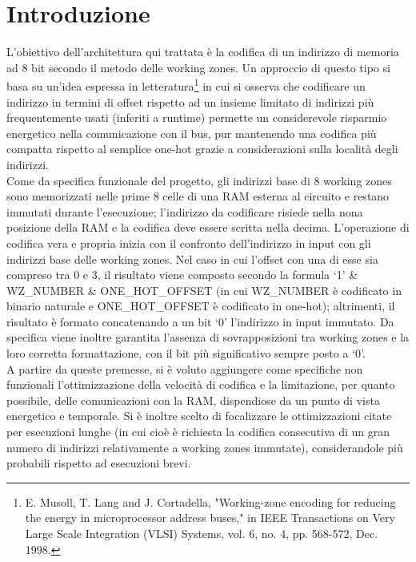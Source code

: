 \documentclass[10pt,english, openany]{book}
\begin{document}
\chapter{Introduzione}\label{chapt:sum}


L’obiettivo dell’architettura qui trattata è la codifica di un indirizzo di memoria ad 8 bit secondo il metodo delle working zones. Un approccio di questo tipo si basa su un’idea espressa in letteratura\footnote{\label{paper_citation}E. Musoll, T. Lang and J. Cortadella, "Working-zone encoding for reducing the energy in microprocessor address buses," in IEEE Transactions on Very Large Scale Integration (VLSI) Systems, vol. 6, no. 4, pp. 568-572, Dec. 1998.} in cui si osserva che codificare un indirizzo in termini di offset rispetto ad un insieme limitato di indirizzi più frequentemente usati (inferiti a runtime) permette un considerevole risparmio energetico nella comunicazione con il bus, pur mantenendo una codifica più compatta rispetto al semplice one-hot grazie a considerazioni sulla località degli indirizzi.\\
Come da specifica funzionale del progetto, gli indirizzi base di 8 working zones sono memorizzati nelle prime 8 celle di una RAM esterna al circuito e restano immutati durante l’esecuzione; l’indirizzo da codificare risiede nella nona posizione della RAM e la codifica deve essere scritta nella decima. L’operazione di codifica vera e propria inizia con il confronto dell’indirizzo in input con gli indirizzi base delle working zones. Nel caso in cui l’offset con una di esse sia compreso tra 0 e 3, il risultato viene composto secondo la formula ‘1’ \& WZ\_NUMBER \& ONE\_HOT\_OFFSET (in cui WZ\_NUMBER è codificato in binario naturale e ONE\_HOT\_OFFSET è codificato in one-hot); altrimenti, il risultato è formato concatenando a un bit ‘0’ l’indirizzo in input immutato. Da specifica viene inoltre garantita l’assenza di sovrapposizioni tra working zones e la loro corretta formattazione, con il bit più significativo sempre posto a ‘0’.\\
A partire da queste premesse, si è voluto aggiungere come specifiche non funzionali l’ottimizzazione della velocità di codifica e la limitazione, per quanto possibile, delle comunicazioni con la RAM, dispendiose da un punto di vista energetico e temporale. Si è inoltre scelto di focalizzare le ottimizzazioni citate per esecuzioni lunghe (in cui cioè è richiesta la codifica consecutiva di un gran numero di indirizzi relativamente a working zones immutate), considerandole più probabili rispetto ad esecuzioni brevi.
\end{document}
